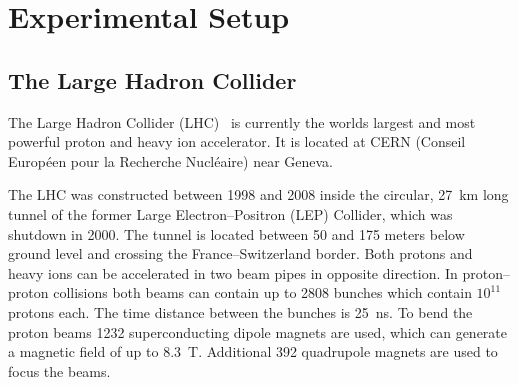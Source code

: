 \chapter{Experimental Setup}\label{cha:setup}

\section{The Large Hadron Collider}\label{sec:setup:lhc}

The Large Hadron Collider (LHC)~\cite{LHC} is currently the worlds largest and most powerful proton and heavy ion accelerator.
It is located at CERN (Conseil Européen pour la Recherche Nucléaire) near Geneva.

The LHC was constructed between 1998 and 2008 inside the circular, \SI{27}{\km} long tunnel
of the former Large Electron--Positron (LEP) Collider, which was shutdown in 2000.
The tunnel is located between 50 and 175 meters below ground level and crossing the France--Switzerland border.
Both protons and heavy ions can be accelerated in two beam pipes in opposite direction.
In proton--proton collisions both beams can contain up to 2808 bunches which contain $10^{11}$ protons each.
The time distance between the bunches is \SI{25}{\ns}.
To bend the proton beams 1232 superconducting dipole magnets are used, which can generate a magnetic field of up
to \SI{8.3}{\tesla}.
Additional 392 quadrupole magnets are used to focus the beams.

